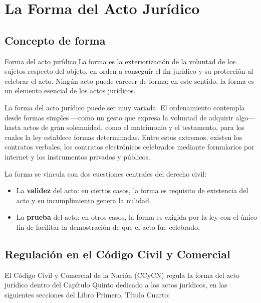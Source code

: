 \documentclass[12pt,oneside]{book}
\begin{document}
\chapter{La Forma del Acto Jurídico}

\section{Concepto de forma}

\begin{definition}{Forma del acto jurídico}
La forma es la exteriorización de la voluntad de los sujetos respecto del objeto, en orden a conseguir el fin jurídico y su protección al celebrar el acto. Ningún acto puede carecer de forma; en este sentido, la forma es un elemento esencial de los actos jurídicos.
\end{definition}

La forma del acto jurídico puede ser muy variada. El ordenamiento contempla desde formas simples —como un gesto que expresa la voluntad de adquirir algo— hasta actos de gran solemnidad, como el matrimonio y el testamento, para los cuales la ley establece formas determinadas. Entre estos extremos, existen los contratos verbales, los contratos electrónicos celebrados mediante formularios por internet y los instrumentos privados y públicos.

La forma se vincula con dos cuestiones centrales del derecho civil:

\begin{itemize}
    \item La \textbf{validez} del acto: en ciertos casos, la forma es requisito de existencia del acto y su incumplimiento genera la nulidad.
    \item La \textbf{prueba} del acto: en otros casos, la forma es exigida por la ley con el único fin de facilitar la demostración de que el acto fue celebrado.
\end{itemize}

\section{Regulación en el Código Civil y Comercial}

El Código Civil y Comercial de la Nación (CCyCN) regula la forma del acto jurídico dentro del Capítulo Quinto dedicado a los actos jurídicos, en las siguientes secciones del Libro Primero, Título Cuarto:
\end{document}
